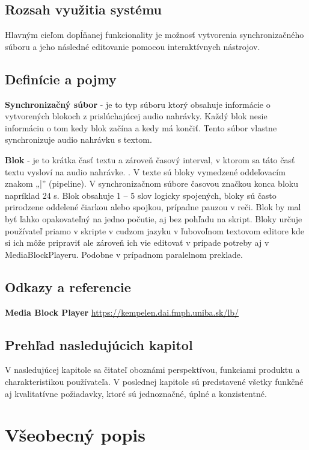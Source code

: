 \documentclass{article}
\begin{document}
\subsection{Rozsah využitia systému}
Hlavným cieľom dopĺňanej funkcionality je možnosť vytvorenia synchronizačného súboru a jeho následné editovanie pomocou interaktívnych nástrojov.

\subsection{Definície a pojmy}
\textbf{Synchronizačný súbor} - je to typ súboru ktorý obsahuje informácie o vytvorených blokoch z prislúchajúcej audio nahrávky. Každý blok nesie informáciu o tom kedy blok začína a kedy má končiť. Tento súbor vlastne synchronizuje audio nahrávku s textom.

\textbf{Blok} - je to krátka časť textu a zároveň časový interval, v ktorom sa táto časť textu vysloví na audio nahrávke. . V texte sú bloky vymedzené oddeľovacím znakom „|” (pipeline). V synchronizačnom súbore časovou značkou konca bloku napríklad 24 s.  Blok obsahuje 1 – 5 slov logicky spojených, bloky sú často prirodzene oddelené čiarkou alebo spojkou, prípadne pauzou v reči. Blok by mal byť ľahko opakovateľný na jedno počutie, aj bez pohľadu na skript. Bloky určuje používateľ priamo v skripte v cudzom jazyku v ľubovoľnom textovom editore kde si ich môže pripraviť ale zároveň ich vie editovať v prípade potreby aj v MediaBlockPlayeru. Podobne v prípadnom paralelnom preklade.


\subsection{Odkazy a referencie}
\textbf{Media Block Player}       \url{https://kempelen.dai.fmph.uniba.sk/lb/}


\subsection{Prehľad nasledujúcich kapitol}
V nasledujúcej kapitole sa čitateľ oboznámi perspektívou, funkciami produktu a charakteristikou používateľa. V poslednej kapitole sú predstavené všetky funkčné aj kvalitatívne požiadavky, ktoré sú jednoznačné, úplné a konzistentné.



\section{Všeobecný popis}
\end{document}
